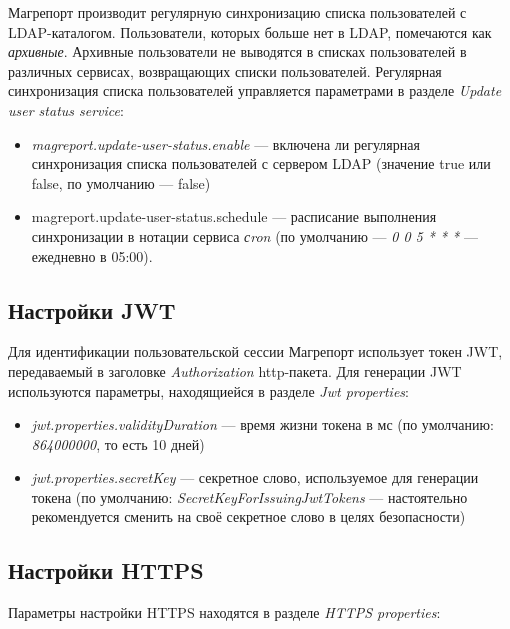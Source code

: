 \documentclass[../user-manual.tex]{subfiles}
\begin{document}
	Магрепорт производит регулярную синхронизацию списка пользователей с LDAP-каталогом. Пользователи, которых больше нет в LDAP, помечаются как \textit{архивные}. Архивные пользователи не выводятся в списках пользователей в различных сервисах, возвращающих списки пользователей. Регулярная синхронизация списка пользователей управляется параметрами в разделе \textit{Update user status service}:
		
	\begin{itemize}
		\item \textit{magreport.update-user-status.enable} --- включена ли регулярная синхронизация списка пользователей с сервером LDAP (значение true или false, по умолчанию --- false)
		
		\item magreport.update-user-status.schedule --- расписание выполнения синхронизации в нотации сервиса \textit{сron} (по умолчанию --- \textit{0 0 5 * * *} --- ежедневно в 05:00).
	\end{itemize}		
	
	\subsection{Настройки JWT}
	
	Для идентификации пользовательской сессии Магрепорт использует токен JWT, передаваемый в заголовке \textit{Authorization} http-пакета. Для генерации JWT используются параметры, находящиейся в разделе \textit{Jwt properties}:
	
	\begin{itemize}
		\item \textit{jwt.properties.validityDuration} --- время жизни токена в мс (по умолчанию: \textit{864000000}, то есть 10 дней)
		
		\item \textit{jwt.properties.secretKey} --- секретное слово, используемое для генерации токена (по умолчанию: \textit{SecretKeyForIssuingJwtTokens} --- настоятельно рекомендуется сменить на своё секретное слово в целях безопасности)
	\end{itemize}
	
	\subsection{Настройки HTTPS}\label{subsection:https-settings}
	
	Параметры настройки HTTPS находятся в разделе \textit{HTTPS properties}:
	
\end{document}
